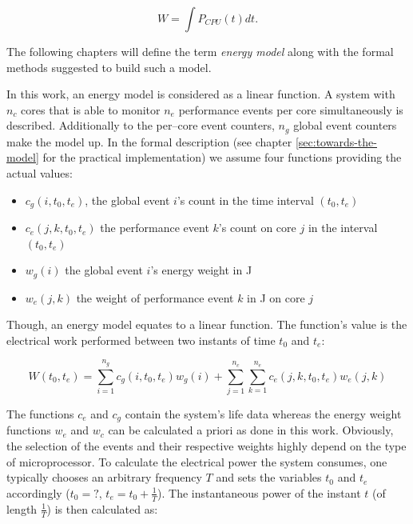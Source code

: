 \begin{equation}
  W = \int P_{CPU}(t)dt.
\end{equation}


\label{sec:model}

The following chapters will define the term \emph{energy model} along with  the
formal methods suggested to build such a model.


\label{sec:model-properties}

In this work, an energy model is considered as a linear function. A system with
$n_c$ cores that is able to monitor $n_e$ performance events per core
simultaneously is described. Additionally to the per--core event counters, $n_g$
global event counters make the model up. In the formal description (see chapter
\ref{sec:towards-the-model} for the practical implementation) we assume four
functions providing the actual values:

\begin{itemize}

\item $c_g(i, t_0, t_e)$, the global event $i$'s count in the time interval
$(t_0, t_e)$

\item $c_e(j, k, t_0, t_e)$ the performance event $k$'s count on core $j$ in the
interval $(t_0, t_e)$

\item $w_g(i)$ the global event $i$'s energy weight in \si{\joule}

\item $w_e(j, k)$ the weight of performance event $k$ in \si{\joule} on core
$j$

\end{itemize}

Though, an energy model equates to a linear function. The function's value is
the electrical work performed between two instants of time $t_0$ and $t_e$:

\begin{equation}
W(t_0, t_e) = \sum\limits_{i=1}^{n_g} c_g(i, t_0, t_e) w_g(i) +
\sum\limits_{j=1}^{n_c} \sum\limits_{k=1}^{n_e} c_e(j, k, t_0, t_e) w_e(j, k)
\end{equation}

The functions $c_e$ and $c_g$ contain the system's life data whereas the energy
weight functions $w_e$ and $w_c$ can be calculated a priori as done in this
work. Obviously, the selection of the events and their respective weights highly
depend on the type of microprocessor. To calculate the electrical power the
system consumes, one typically chooses an arbitrary frequency $T$ and sets the
variables $t_0$ and $t_e$ accordingly ($t_0 = ?$, $t_e = t_0 + \frac{1}{T}$).
The instantaneous power of the instant $t$ (of length $\frac{1}{T}$) is then
calculated as:

